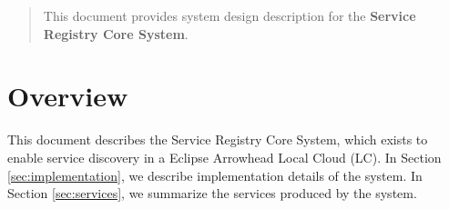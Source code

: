 \documentclass[a4paper]{arrowhead}
\begin{document}
\ArrowheadDate{\today}
\ArrowheadSetup

\begin{center}
  \vspace*{1cm}
  \huge{\arrowtitle}

  \vspace*{0.2cm}
  \LARGE{\arrowtype}
  \vspace*{1cm}

  \vspace*{\fill}


  \vspace*{1cm}
  \vspace*{\fill}

  \begin{abstract}
    This document provides system design description for the \textbf{Service Registry Core System}.
  \end{abstract}

  \vspace*{1cm}

 \end{center}

\newpage

\tableofcontents
\newpage

\section{Overview}
\label{sec:overview}
\color{black}
This document describes the Service Registry Core System, which exists to enable service discovery in a Eclipse Arrowhead Local Cloud (LC). In Section \ref{sec:implementation}, we describe implementation details of the system. In Section \ref{sec:services}, we summarize the services produced by the system.
\end{document}
